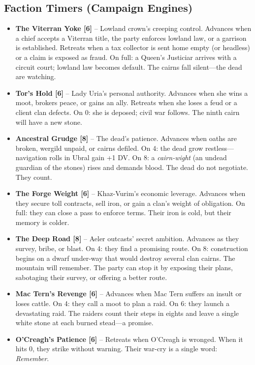 \subsection*{Faction Timers (Campaign Engines)}
\label{subsec:ubral-timers}
\begin{itemize}
\item \textbf{The Viterran Yoke [6]} -- Lowland crown's creeping control. Advances when a chief accepts a Viterran title, the party enforces lowland law, or a garrison is established. Retreats when a tax collector is sent home empty (or headless) or a claim is exposed as fraud. On full: a Queen's Justiciar arrives with a circuit court; lowland law becomes default. The cairns fall silent---the dead are watching.
\item \textbf{Tor's Hold [6]} -- Lady Uria's personal authority. Advances when she wins a moot, brokers peace, or gains an ally. Retreats when she loses a feud or a client clan defects. On 0: she is deposed; civil war follows. The ninth cairn will have a new stone.
\item \textbf{Ancestral Grudge [8]} -- The dead's patience. Advances when oaths are broken, wergild unpaid, or cairns defiled. On 4: the dead grow restless---navigation rolls in Ubral gain +1 DV. On 8: a \textit{cairn-wight} (an undead guardian of the stones) rises and demands blood. The dead do not negotiate. They count.
\item \textbf{The Forge Weight [6]} -- Khaz-Vurim's economic leverage. Advances when they secure toll contracts, sell iron, or gain a clan's weight of obligation. On full: they can close a pass to enforce terms. Their iron is cold, but their memory is colder.
\item \textbf{The Deep Road [8]} -- Aeler outcasts' secret ambition. Advances as they survey, bribe, or blast. On 4: they find a promising route. On 8: construction begins on a dwarf under-way that would destroy several clan cairns. The mountain will remember. The party can stop it by exposing their plans, sabotaging their survey, or offering a better route.
\item \textbf{Mac Tern's Revenge [6]} -- Advances when Mac Tern suffers an insult or loses cattle. On 4: they call a moot to plan a raid. On 6: they launch a devastating raid. The raiders count their steps in eights and leave a single white stone at each burned stead---a promise.
\item \textbf{O'Creagh's Patience [6]} -- Retreats when O'Creagh is wronged. When it hits 0, they strike without warning. Their war-cry is a single word: \textit{Remember}.
\end{itemize}

